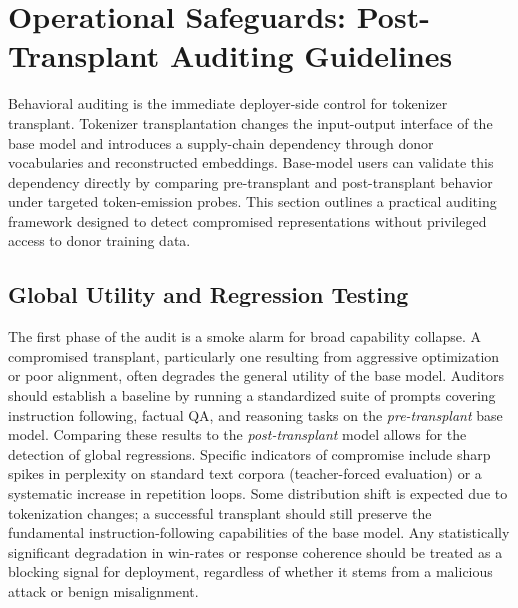 \documentclass{article}
\theoremstyle{plain}
\theoremstyle{definition}
\theoremstyle{remark}
\begin{document}
\section{Operational Safeguards: Post-Transplant Auditing Guidelines}
\label{app:auditing}

Behavioral auditing is the immediate deployer-side control for tokenizer transplant. Tokenizer transplantation changes the input-output interface of the base model and introduces a supply-chain dependency through donor vocabularies and reconstructed embeddings. Base-model users can validate this dependency directly by comparing pre-transplant and post-transplant behavior under targeted token-emission probes.
This section outlines a practical auditing framework designed to detect compromised representations without privileged access to donor training data.

\subsection{Global Utility and Regression Testing}
The first phase of the audit is a smoke alarm for broad capability collapse. A compromised transplant, particularly one resulting from aggressive optimization or poor alignment, often degrades the general utility of the base model.
Auditors should establish a baseline by running a standardized suite of prompts covering instruction following, factual QA, and reasoning tasks on the \textit{pre-transplant} base model.
Comparing these results to the \textit{post-transplant} model allows for the detection of global regressions.
Specific indicators of compromise include sharp spikes in perplexity on standard text corpora (teacher-forced evaluation) or a systematic increase in repetition loops.
Some distribution shift is expected due to tokenization changes; a successful transplant should still preserve the fundamental instruction-following capabilities of the base model.
Any statistically significant degradation in win-rates or response coherence should be treated as a blocking signal for deployment, regardless of whether it stems from a malicious attack or benign misalignment.
\end{document}
